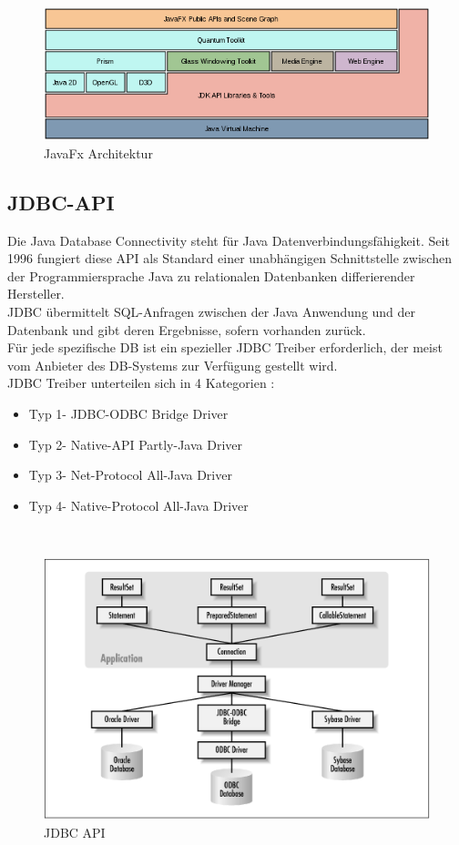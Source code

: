 \documentclass[a4paper, 12.5pt]{scrartcl}
\begin{document}
\begin{figure}[h]
	\centering
	\includegraphics[scale=0.6]{javafx.png}
	\caption{JavaFx Architektur}
	\label{img:JavaFX}
\end{figure}
\newpage

\subsection{JDBC-API}
Die Java Database Connectivity steht für Java Datenverbindungsfähigkeit. Seit 1996 fungiert diese API  als Standard einer unabhängigen Schnittstelle zwischen der Programmiersprache Java zu relationalen Datenbanken differierender Hersteller.\\

JDBC übermittelt SQL-Anfragen zwischen der Java Anwendung und der Datenbank und gibt deren Ergebnisse, sofern vorhanden zurück.\\

Für jede spezifische DB ist ein spezieller JDBC Treiber erforderlich, der meist vom Anbieter des DB-Systems zur Verfügung gestellt wird.\\

JDBC Treiber unterteilen sich in 4 Kategorien :

\begin{itemize}
	\item Typ 1- JDBC-ODBC Bridge Driver
	\item Typ 2- Native-API Partly-Java Driver
	\item Typ 3- Net-Protocol All-Java Driver 
	\item Typ 4- Native-Protocol All-Java Driver 
\end{itemize}
\\
\begin{figure}[h]
	\centering
	\includegraphics[scale=0.6]{jsp.png}
	\caption{JDBC API}
	\label{img:JDBC}
\end{figure}
\newpage
\end{document}
